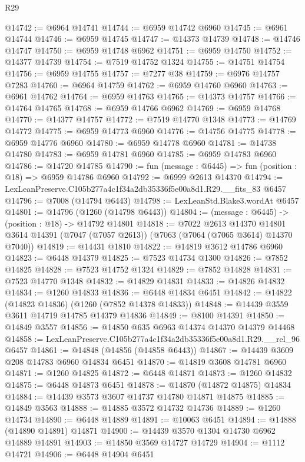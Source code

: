 \begin{lexlean}{R29}
\begin{coremodule}
@14742 := @6964 @14741
@14744 := @6959 @14742 @6960
@14745 := @6961 @14744
@14746 := @6959 @14745
@14747 := @14373 @14739
@14748 := @14746 @14747
@14750 := @6959 @14748 @6962
@14751 := @6959 @14750
@14752 := @14377 @14739
@14754 := @7519 @14752 @1324
@14755 := @14751 @14754
@14756 := @6959 @14755
@14757 := @7277 @38
@14759 := @6976 @14757 @7283
@14760 := @6964 @14759
@14762 := @6959 @14760 @6960
@14763 := @6961 @14762
@14764 := @6959 @14763
@14765 := @14373 @14757
@14766 := @14764 @14765
@14768 := @6959 @14766 @6962
@14769 := @6959 @14768
@14770 := @14377 @14757
@14772 := @7519 @14770 @1348
@14773 := @14769 @14772
@14775 := @6959 @14773 @6960
@14776 := @14756 @14775
@14778 := @6959 @14776 @6960
@14780 := @6959 @14778 @6960
@14781 := @14738 @14780
@14783 := @6959 @14781 @6960
@14785 := @6959 @14783 @6960
@14786 := @14720 @14785
@14790 := fun (message : @6445) => fun (position : @18) => @6959 @14786 @6960
@14792 := @6999 @2613 @14370
@14794 := LexLeanPreserve.C105b277a4c1f34a2db35336f5e00a8d1.R29.__fits_83 @6457
@14796 := @7008 (@14794 @6443)
@14798 := LexLeanStd.Blake3.wordAt @6457
@14801 := @14796 (@1260 (@14798 @6443))
@14804 := (message : @6445) -> (position : @18) -> @14792 @14801
@14818 := @7022
    @2613
    @14370
    @14801
    @3614
    @14391
    (@7047 (@7057 @2613))
    (@7063 (@7064 (@7065 @3614) @14370 @7040))
@14819 := @14431 @1810
@14822 := @14819 @3612 @14786 @6960
@14823 := @6448 @14379
@14825 := @7523 @14734 @1300
@14826 := @7852 @14825
@14828 := @7523 @14752 @1324
@14829 := @7852 @14828
@14831 := @7523 @14770 @1348
@14832 := @14829 @14831
@14833 := @14826 @14832
@14834 := @1260 @14833
@14836 := @6448 @14834 @6451
@14842 := @14822 (@14823 @14836) (@1260 (@7852 @14378 @14833))
@14848 := @14439 @3559 @3611 @14719 @14785 @14379 @14836
@14849 := @8100 @14391
@14850 := @14849 @3557
@14856 := @14850 @635 @6963 @14374 @14370 @14379 @14468
@14858 := LexLeanPreserve.C105b277a4c1f34a2db35336f5e00a8d1.R29.__rel_96 @6457
@14861 := @14848 (@14856 (@14858 @6443))
@14867 := @14439 @3609 @208 @14783 @6960 @14834 @6451
@14870 := @14819 @3608 @14781 @6960
@14871 := @1260 @14825
@14872 := @6448 @14871
@14873 := @1260 @14832
@14875 := @6448 @14873 @6451
@14878 := @14870 (@14872 @14875) @14834
@14884 := @14439 @3573 @3607 @14737 @14780 @14871 @14875
@14885 := @14849 @3563
@14888 := @14885 @3572 @14732 @14736
@14889 := @1260 @14734
@14890 := @6448 @14889
@14891 := @10063 @6451
@14894 := @14888 (@14890 @14891) @14871
@14900 := @14439 @3570 @1304 @14730 @6962 @14889 @14891
@14903 := @14850 @3569 @14727 @14729
@14904 := @1112 @14721
@14906 := @6448 @14904 @6451

\end{coremodule}
\end{lexlean}
